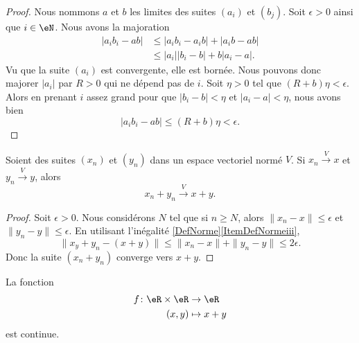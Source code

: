 \begin{proof}
    Nous nommons \( a\) et \( b\) les limites des suites \( (a_i)\) et \( (b_j)\). Soit \( \epsilon>0\) ainsi que \( i\in \eN\). Nous avons la majoration
    \begin{subequations}
        \begin{align}
            | a_ib_i-ab |&\leq | a_ib_i-a_ib |+| a_ib-ab |\\
            &\leq | a_i | |b_i-b |+b| a_i-a |.
        \end{align}
    \end{subequations}
    Vu que la suite \( (a_i)\) est convergente, elle est bornée. Nous pouvons donc majorer \( | a_i |\) par \( R>0\) qui ne dépend pas de \( i\). Soit \( \eta>0\) tel que \( (R+b)\eta<\epsilon\). Alors en prenant \( i\) assez grand pour que \( | b_i-b |<\eta\) et \( | a_i-a |<\eta\), nous avons bien
    \begin{equation}
        | a_ib_i-ab |\leq (R+b)\eta<\epsilon.
    \end{equation}
\end{proof}

\begin{proposition}     \label{PROPooICZMooGfLdPc}
    Soient des suites \( (x_n)\) et \( (y_n)\) dans un espace vectoriel normé \( V\). Si \( x_n\stackrel{V}{\longrightarrow}x\) et \( y_n\stackrel{V}{\longrightarrow}y\), alors
    \begin{equation}
        x_n+y_n\stackrel{V}{\longrightarrow}x+y.
    \end{equation}
\end{proposition}

\begin{proof}
    Soit \( \epsilon>0\). Nous considérons \( N\) tel que si \( n\geq N\), alors \( \| x_n-x \|\leq \epsilon\) et \( \| y_n-y \|\leq \epsilon\). En utilisant l'inégalité \ref{DefNorme}\ref{ItemDefNormeiii},
    \begin{equation}
        \| x_y+y_n-(x+y) \|\leq \| x_n-x \|+\| y_n-y \|\leq 2\epsilon.
    \end{equation}
    Donc la suite \( (x_n+y_n)\) converge vers \( x+y\).
\end{proof}


\begin{lemma}       \label{LEMooGKIPooWgpFTB}
    La fonction
    \begin{equation}
        \begin{aligned}
            f\colon \eR\times \eR&\to \eR \\
            (x,y)&\mapsto x+y 
        \end{aligned}
    \end{equation}
    est continue.
\end{lemma}


